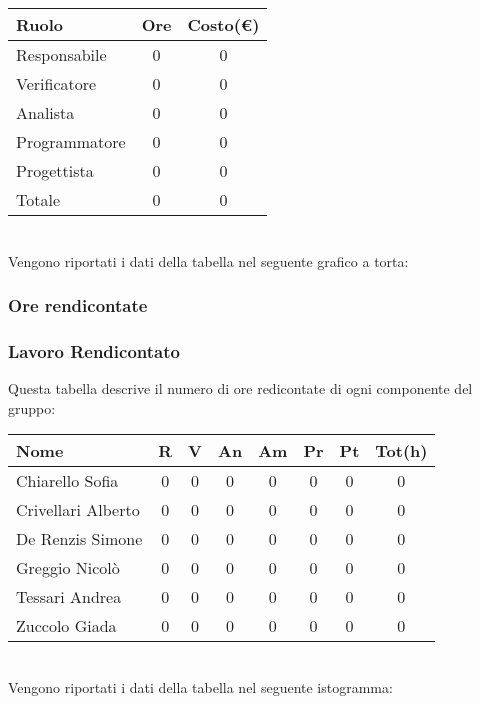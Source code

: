\begin{tabular}{|l|c|c|}
\hline
Ruolo & Ore & Costo(€)\\
\hline
Responsabile & 0 & 0\\
Verificatore & 0 & 0\\
Analista & 0 & 0\\
Programmatore & 0 & 0\\
Progettista & 0 & 0\\
Totale & 0& 0\\
\hline
\end{tabular}\\


Vengono riportati i dati della tabella nel seguente grafico a torta: \\




\subsubsection{Ore rendicontate}
\subsubsection{Lavoro Rendicontato}
Questa tabella descrive il numero di ore redicontate di ogni componente del gruppo: \\

\begin{tabular}{|l|cccccc|c|}
\hline
Nome & R &  V & An & Am & Pr & Pt & Tot(h)\\
\hline
Chiarello Sofia & 0 & 0 & 0 & 0 & 0 & 0 & 0\\
Crivellari Alberto & 0 & 0 & 0 & 0 & 0 & 0 & 0\\
De Renzis Simone & 0 & 0 & 0 & 0 & 0 & 0 & 0\\
Greggio Nicolò & 0 & 0 & 0 & 0 & 0 & 0 & 0\\
Tessari Andrea & 0 & 0 & 0 & 0 & 0 & 0 & 0\\
Zuccolo Giada & 0 & 0 & 0 & 0 & 0 & 0 & 0\\
\hline
\end{tabular}
\\
Vengono riportati i dati della tabella nel seguente istogramma: \\

